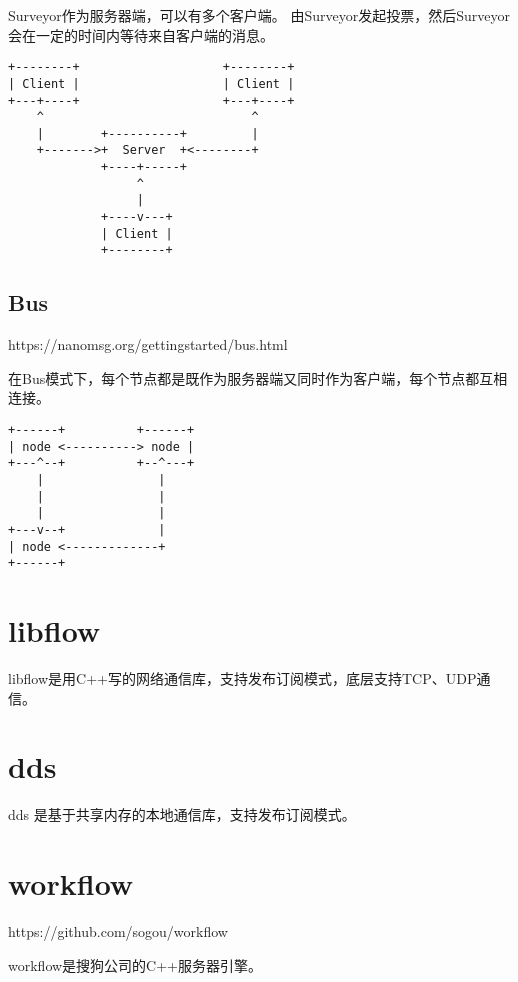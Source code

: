 Surveyor作为服务器端，可以有多个客户端。
由Surveyor发起投票，然后Surveyor会在一定的时间内等待来自客户端的消息。

\begin{verbatim}
+--------+                    +--------+
| Client |                    | Client |
+---+----+                    +---+----+
    ^                             ^
    |        +----------+         |
    +------->+  Server  +<--------+
             +----+-----+
                  ^
                  |
             +----v---+
             | Client |
             +--------+
\end{verbatim}

\subsection{Bus}

https://nanomsg.org/gettingstarted/bus.html

在Bus模式下，每个节点都是既作为服务器端又同时作为客户端，每个节点都互相连接。

\begin{verbatim}
+------+          +------+
| node <----------> node |
+---^--+          +--^---+
    |                |
    |                |
    |                |
+---v--+             |
| node <-------------+
+------+
\end{verbatim}

\section{libflow}

libflow是用C++写的网络通信库，支持发布订阅模式，底层支持TCP、UDP通信。

\section{dds}

dds 是基于共享内存的本地通信库，支持发布订阅模式。

\section{workflow}

https://github.com/sogou/workflow

workflow是搜狗公司的C++服务器引擎。

